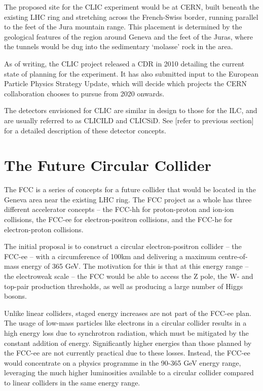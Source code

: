 The proposed site for the \acrshort{CLIC} experiment would be at \acrshort{CERN}, built beneath the existing \acrshort{LHC} ring and stretching across the French-Swiss border, running parallel to the feet of the Jura mountain range. This placement is determined by the geological features of the region around Geneva and the feet of the Juras, where the tunnels would be dug into the sedimentary `molasse' rock in the area. 

As of writing, the \acrshort{CLIC} project released a \acrfull{CDR} in 2010 detailing the current state of planning for the experiment. It has also submitted input to the European Particle Physics Strategy Update, which will decide which projects the \acrshort{CERN} collaboration chooses to pursue from 2020 onwards.

The detectors envisioned for \acrshort{CLIC} are similar in design to those for the \acrshort{ILC}, and are usually referred to as CLIC\textunderscore ILD and CLIC\textunderscore SiD. See [refer to previous section] for a detailed description of these detector concepts.

\section{The Future Circular Collider}
The \acrfull{FCC} is a series of concepts for a future collider that would be located in the Geneva area near the existing LHC ring. The \acrshort{FCC} project as a whole has three different accelerator concepts -- the FCC-hh for proton-proton and ion-ion collisions, the FCC-ee for electron-positron collisions, and the FCC-he for electron-proton collisions.

The initial proposal is to construct a circular electron-positron collider -- the FCC-ee -- with a circumference of 100km and delivering a maximum centre-of-mass energy of 365 GeV. The motivation for this is that at this energy range -- the electroweak scale -- the \acrshort{FCC} would be able to access the Z pole, the W- and top-pair production thresholds, as well as producing a large number of Higgs bosons. 

Unlike linear colliders, staged energy increases are not part of the FCC-ee plan. The usage of low-mass particles like electrons in a circular collider results in a high energy loss due to synchrotron radiation, which must be mitigated by the constant addition of energy. Significantly higher energies than those planned by the FCC-ee are not currently practical due to these losses. Instead, the FCC-ee would concentrate on a physics programme in the 90-365 GeV energy range, leveraging the much higher luminosities available to a circular collider compared to linear colliders in the same energy range.

